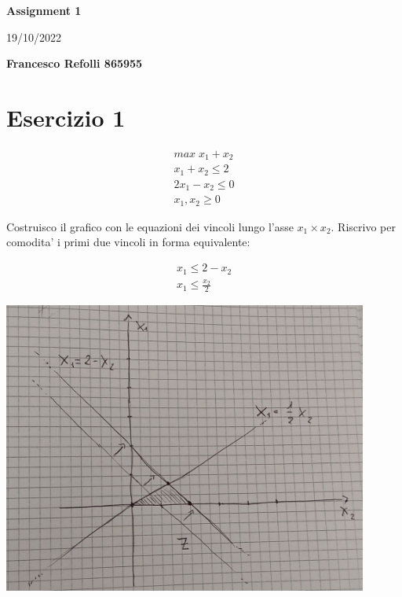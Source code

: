 \documentclass[a4paper,12pt,oneside]{article}
\begin{document}
    \thispagestyle{plain}
    \begin{center}
        \normalsize
        \textbf{Assignment 1}
            
        \vspace{0.2cm}
        \normalsize
        19/10/2022
            
        \vspace{0.2cm}
        \textbf{Francesco Refolli 865955}
    \end{center}

    \section{Esercizio 1}

    \begin{align}
        \text{$max \; x_1 + x_2$} \\
        \text{$x_1 + x_2 \leq 2$} \\
        \text{$2 x_1 - x_2 \leq 0$} \\
        \text{$x_1, x_2 \geq 0$}
    \end{align}

    Costruisco il grafico con le equazioni dei vincoli lungo l'asse $x_1 \times x_2$.
    Riscrivo per comodita' i primi due vincoli in forma equivalente:

    \begin{align}
        \text{$x_1 \leq 2 - x_2$} \\
        \text{$x_1 \leq \frac {x_2} 2$}
    \end{align}

    \begin{center}
        \includegraphics[width=12cm]{grafico.jpg}
    \end{center}
\end{document}
